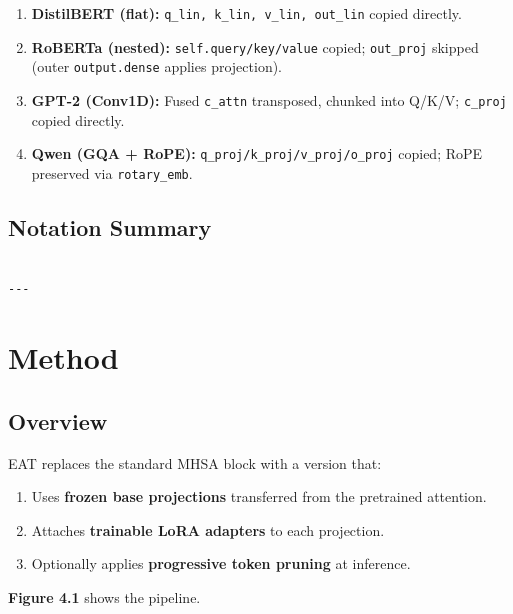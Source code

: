 \begin{enumerate}
\item \textbf{DistilBERT (flat):} \texttt{q\_lin, k\_lin, v\_lin, out\_lin} copied directly.
\item \textbf{RoBERTa (nested):} \texttt{self.query/key/value} copied; \texttt{out\_proj} skipped
  (outer \texttt{output.dense} applies projection).
\item \textbf{GPT-2 (Conv1D):} Fused \texttt{c\_attn} transposed, chunked into Q/K/V;
  \texttt{c\_proj} copied directly.
\item \textbf{Qwen (GQA + RoPE):} \texttt{q\_proj/k\_proj/v\_proj/o\_proj} copied; RoPE
  preserved via \texttt{rotary\_emb}.

\end{enumerate}
\subsection{Notation Summary}

\begin{lstlisting}

---
\end{lstlisting}


\section{Method}

\subsection{Overview}

EAT replaces the standard MHSA block with a version that:

\begin{enumerate}
\item Uses \textbf{frozen base projections} transferred from the pretrained attention.
\item Attaches \textbf{trainable LoRA adapters} to each projection.
\item Optionally applies \textbf{progressive token pruning} at inference.

\end{enumerate}
\textbf{Figure 4.1} shows the pipeline.

